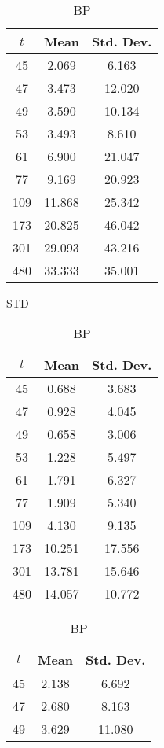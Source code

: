 \begin{table}[ht]
\begin{subtable}{0.33\textwidth}
\centering
{\tablecolors
\begin{tabular}{|c|c|c|}
\hline
$t$ & Mean & Std. Dev. \\
\hline
45 & 2.069 & 6.163 \\
\hline
47 & 3.473 & 12.020 \\
\hline
49 & 3.590 & 10.134 \\
\hline
53 & 3.493 & 8.610 \\
\hline
61 & 6.900 & 21.047 \\
\hline
77 & 9.169 & 20.923 \\
\hline
109 & 11.868 & 25.342 \\
\hline
173 & 20.825 & 46.042 \\
\hline
301 & 29.093 & 43.216 \\
\hline
480 & 33.333 & 35.001 \\
\hline
\end{tabular}}
\caption{\pp{} STD}
\end{subtable}%
\begin{subtable}{0.33\textwidth}
\centering
{\tablecolors
\begin{tabular}{|c|c|c|}
\hline
$t$ & Mean & Std. Dev. \\
\hline
45 & 0.688 & 3.683 \\
\hline
47 & 0.928 & 4.045 \\
\hline
49 & 0.658 & 3.006 \\
\hline
53 & 1.228 & 5.497 \\
\hline
61 & 1.791 & 6.327 \\
\hline
77 & 1.909 & 5.340 \\
\hline
109 & 4.130 & 9.135 \\
\hline
173 & 10.251 & 17.556 \\
\hline
301 & 13.781 & 15.646 \\
\hline
480 & 14.057 & 10.772 \\
\hline
\end{tabular}}
\caption{\sr{} BP}
\end{subtable}%
\begin{subtable}{0.33\textwidth}
\centering
{\tablecolors
\begin{tabular}{|c|c|c|}
\hline
$t$ & Mean & Std. Dev. \\
\hline
45 & 2.138 & 6.692 \\
\hline
47 & 2.680 & 8.163 \\
\hline
49 & 3.629 & 11.080 \\
\hline

\end{tabular}}
\end{subtable}
\end{table}
